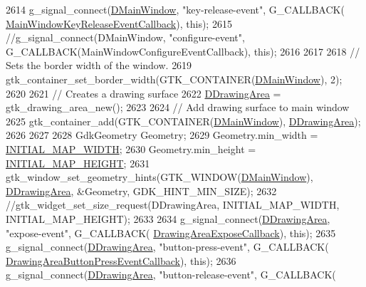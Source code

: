 \begin{DoxyCode}
2614     g\_signal\_connect(\hyperlink{classCApplicationData_af3c57a84b4ecca8a7f86b67a0ae55372}{DMainWindow}, \textcolor{stringliteral}{"key-release-event"}, G\_CALLBACK(
      \hyperlink{classCApplicationData_a4b2c76db5c2efd75404502e36700f99b}{MainWindowKeyReleaseEventCallback}), \textcolor{keyword}{this});
2615     \textcolor{comment}{//g\_signal\_connect(DMainWindow, "configure-event", G\_CALLBACK(MainWindowConfigureEventCallback), this);}
2616     
2617     
2618     \textcolor{comment}{// Sets the border width of the window. }
2619     gtk\_container\_set\_border\_width(GTK\_CONTAINER(\hyperlink{classCApplicationData_af3c57a84b4ecca8a7f86b67a0ae55372}{DMainWindow}), 2);
2620     
2621     \textcolor{comment}{// Creates a drawing surface}
2622     \hyperlink{classCApplicationData_a4735f5d31632313e0b2a1659eb178987}{DDrawingArea} = gtk\_drawing\_area\_new();
2623 
2624     \textcolor{comment}{// Add drawing surface to main window}
2625     gtk\_container\_add(GTK\_CONTAINER(\hyperlink{classCApplicationData_af3c57a84b4ecca8a7f86b67a0ae55372}{DMainWindow}), \hyperlink{classCApplicationData_a4735f5d31632313e0b2a1659eb178987}{DDrawingArea});
2626     
2627     
2628     GdkGeometry Geometry;
2629     Geometry.min\_width = \hyperlink{main_8cpp_ad7891427e5564fd0ea2a08a5857e4239}{INITIAL\_MAP\_WIDTH};
2630     Geometry.min\_height = \hyperlink{main_8cpp_ab9501bd883652bf538087bf32b51a10f}{INITIAL\_MAP\_HEIGHT};
2631     gtk\_window\_set\_geometry\_hints(GTK\_WINDOW(\hyperlink{classCApplicationData_af3c57a84b4ecca8a7f86b67a0ae55372}{DMainWindow}), 
      \hyperlink{classCApplicationData_a4735f5d31632313e0b2a1659eb178987}{DDrawingArea}, &Geometry, GDK\_HINT\_MIN\_SIZE);
2632     \textcolor{comment}{//gtk\_widget\_set\_size\_request(DDrawingArea, INITIAL\_MAP\_WIDTH, INITIAL\_MAP\_HEIGHT);}
2633     
2634     g\_signal\_connect(\hyperlink{classCApplicationData_a4735f5d31632313e0b2a1659eb178987}{DDrawingArea}, \textcolor{stringliteral}{"expose-event"}, G\_CALLBACK(
      \hyperlink{classCApplicationData_af2ec09e61420f6c493d7ef25e4a7bd11}{DrawingAreaExposeCallback}), \textcolor{keyword}{this});
2635     g\_signal\_connect(\hyperlink{classCApplicationData_a4735f5d31632313e0b2a1659eb178987}{DDrawingArea}, \textcolor{stringliteral}{"button-press-event"}, G\_CALLBACK(
      \hyperlink{classCApplicationData_aaa867e992733fa1e88e67c026c8a2947}{DrawingAreaButtonPressEventCallback}), \textcolor{keyword}{this});
2636     g\_signal\_connect(\hyperlink{classCApplicationData_a4735f5d31632313e0b2a1659eb178987}{DDrawingArea}, \textcolor{stringliteral}{"button-release-event"}, G\_CALLBACK(

\end{DoxyCode}

